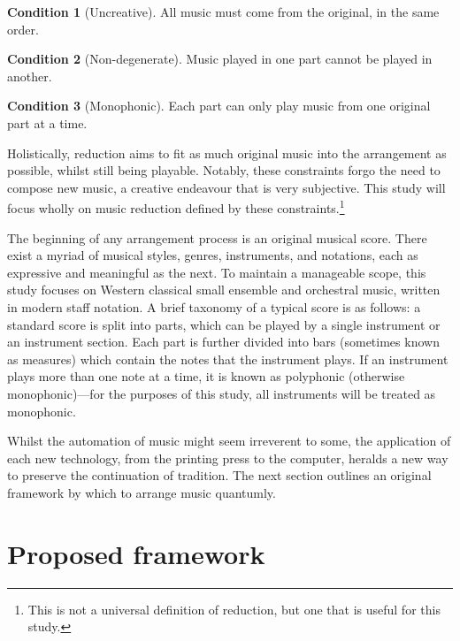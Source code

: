 \documentclass[12pt]{article}
\theoremstyle{definition}
\newtheorem{condition}{Condition}
\begin{document}
\begin{condition}[Uncreative]
    All music must come from the original, in the same order.
    \label{con:uncreative}
\end{condition}
\begin{condition}[Non-degenerate]
    Music played in one part cannot be played in another.
    \label{con:non-degenerate}
\end{condition}
\begin{condition}[Monophonic]
    Each part can only play music from one original part at a time.
    \label{con:monophonic}
\end{condition}

Holistically, reduction aims to fit as much original music into the arrangement as possible, whilst still being playable. Notably, these constraints forgo the need to compose new music, a creative endeavour that is very subjective. This study will focus wholly on music reduction defined by these constraints.\footnote{This is not a universal definition of reduction, but one that is useful for this study.}

The beginning of any arrangement process is an original musical score. There exist a myriad of musical styles, genres, instruments, and notations, each as expressive and meaningful as the next. To maintain a manageable scope, this study focuses on Western classical small ensemble and orchestral music, written in modern staff notation. A brief taxonomy of a typical score is as follows: a standard score is split into parts, which can be played by a single instrument or an instrument section. Each part is further divided into bars (sometimes known as measures) which contain the notes that the instrument plays. If an instrument plays more than one note at a time, it is known as polyphonic (otherwise monophonic)---for the purposes of this study, all instruments will be treated as monophonic.

Whilst the automation of music might seem irreverent to some, the application of each new technology, from the printing press to the computer, heralds a new way to preserve the continuation of tradition. The next section outlines an original framework by which to arrange music quantumly.

\section{Proposed framework}
\end{document}
